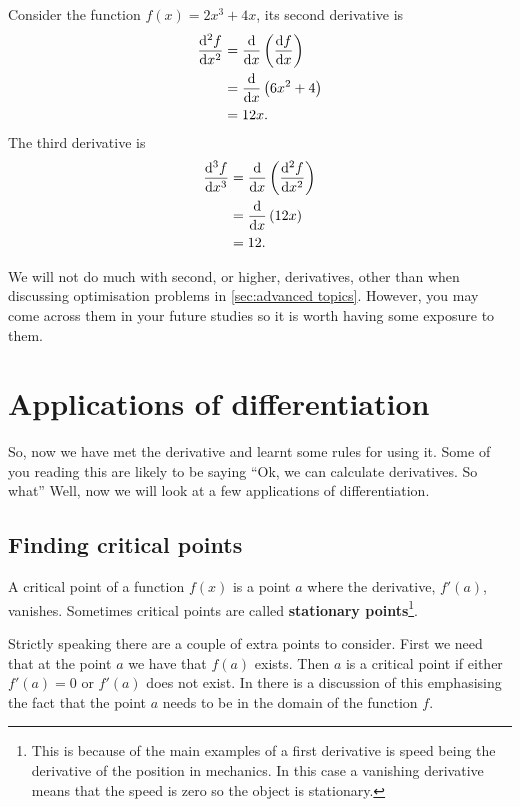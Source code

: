 \begin{ex}
Consider the function $f(x)=2x^{3}+4x$, its second derivative is
\begin{align*}
\frac{\mathrm{d}^{2}f}{\mathrm{d} x^{2}}	&=\frac{\mathrm{d}}{\mathrm{d} x}\left(\frac{\mathrm{d} f}{\mathrm{d} x}\right)\\
					&=\frac{\mathrm{d}}{\mathrm{d} x}\left(6x^{2}+4\right)\\
					&=12x.
\end{align*}
The third derivative is
\begin{align*}
\frac{\mathrm{d}^{3}f}{\mathrm{d} x^{3}}	&=\frac{\mathrm{d}}{\mathrm{d} x}\left(\frac{\mathrm{d}^{2}f}{\mathrm{d} x^{2}}\right)\\
					&=\frac{\mathrm{d}}{\mathrm{d} x}\left(12x\right)\\
					&=12.
\end{align*}
\end{ex}

We will not do much with second, or higher, derivatives, other than when discussing optimisation problems in \cref{sec:advanced topics}. However, you may come across them in your future studies so it is worth having some exposure to them.

\section{Applications of differentiation}
So, now we have met the derivative and learnt some rules for using it. Some of you reading this are likely to be saying ``Ok, we can calculate derivatives. So what\textinterrobang'' Well, now we will look at a few applications of differentiation.

\subsection*{Finding critical points}
A critical point of a function $f(x)$ is a point $a$ where the derivative,  $f'(a)$, vanishes. Sometimes critical points are called \textbf{stationary points}\footnote{This is because of the main examples of a first derivative is speed being the derivative of the position in mechanics. In this case a vanishing derivative means that the speed is zero so the object is stationary.}.

\begin{mdiv}
Strictly speaking there are a couple of extra points to consider. First we need that at the point $a$ we have that $f(a)$ exists. Then $a$ is a critical point if either $f'(a)=0$ or $f'(a)$ does not exist. In \citep{calcI} there is a discussion of this emphasising the fact that the point $a$ needs to be in the domain of the function $f$.
\end{mdiv}

